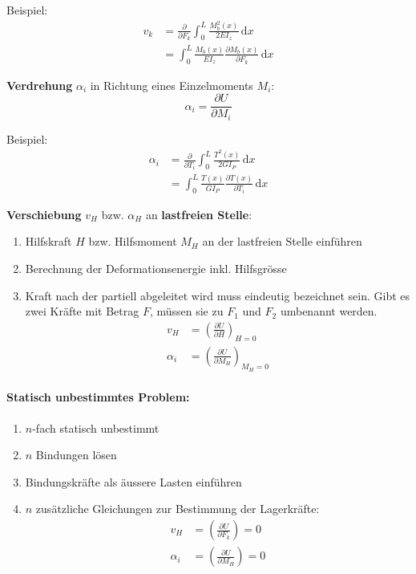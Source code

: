 \documentclass{article}
\newcommand{\ud}{\,\mathrm{d}}
\begin{document}
\begin{multicols*}{4}
						Beispiel:
						\begin{align*}
							v_k &= \frac{\partial}{\partial F_k} \int_0^L \frac{M_b^2(x)}{2EI_z} \ud x \\
							&= \int_0^L \frac{M_b(x)}{EI_z} \frac{\partial M_b(x)}{\partial F_k} \ud x
						\end{align*}
						
						\textbf{Verdrehung} $\alpha_i$ in Richtung eines Einzelmoments $M_i$:
						\[
							\alpha_i = \frac{\partial U}{\partial M_i}
						\]
						
						Beispiel:
						\begin{align*}
							\alpha_i &= \frac{\partial}{\partial T_i} \int_0^L \frac{T^2(x)}{2GI_P} \ud x \\
							&= \int_0^L \frac{T(x)}{GI_P} \frac{\partial T(x)}{\partial T_i} \ud x
						\end{align*}
						
						\textbf{Verschiebung} $v_H$ bzw. $\alpha_H$ an \textbf{lastfreien Stelle}:
						\begin{enumerate}
							\item Hilfskraft $H$ bzw. Hilfsmoment $M_H$ an der lastfreien Stelle einführen
							\item Berechnung der Deformationsenergie inkl. Hilfsgrösse
							\item Kraft nach der partiell abgeleitet wird muss eindeutig
							bezeichnet sein. Gibt es zwei Kräfte mit Betrag $F$, müssen sie
							zu $F_1$ und $F_2$ umbenannt werden.
							\begin{align*}
								v_H &= \left(\frac{\partial U}{\partial H}\right)_{H=0} \\
								\alpha_i &= \left(\frac{\partial U}{\partial M_H}\right)_{M_H=0}
							\end{align*}
						\end{enumerate}
					\paragraph{Statisch unbestimmtes Problem:} %
						\begin{enumerate}
							\item $n$-fach statisch unbestimmt
							\item $n$ Bindungen lösen
							\item Bindungskräfte als äussere Lasten einführen
							\item $n$ zusätzliche Gleichungen zur Bestimmung der Lagerkräfte:
							\begin{align*}
								v_H &= \left(\frac{\partial U}{\partial F_k}\right) = 0 \\
								\alpha_i &= \left(\frac{\partial U}{\partial M_H}\right) = 0
							\end{align*}
						\end{enumerate}

\end{multicols*}
\end{document}
